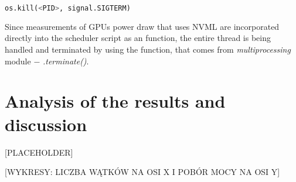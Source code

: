 \begin{lstlisting}[language=Python]
    os.kill(<PID>, signal.SIGTERM)
\end{lstlisting}

Since measurements of GPUs power draw that uses NVML are incorporated directly
into the scheduler script as an function, the entire thread is being handled
and terminated by using the function, that comes from \emph{multiprocessing}
module $-$ \emph{.terminate\@()}.

\section{Analysis of the results and discussion}

[PLACEHOLDER]

[WYKRESY: LICZBA WĄTKÓW NA OSI X I POBÓR MOCY NA OSI Y]













































